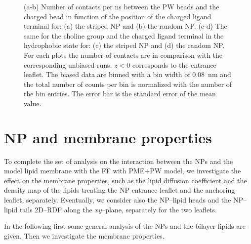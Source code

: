 \begin{figure}[ht!]
{		}
		\caption{(a-b) Number of contacts per ns between the \acs{PW} beads and the charged bead in function of the position of the charged ligand terminal for: (a) the striped \acs{NP} and (b) the random \acs{NP}. (c-d) The same for the choline group and the charged ligand terminal in the hydrophobic state for: (c) the striped \ac{NP} and (d) the random \acs{NP}. For each plots the number of contacts are in comparison with the corresponding unbiased runs. $z<0$ corresponds to the entrance leaflet. The biased data are binned with a bin width of $0.08$~nm and the total number of counts per bin is normalized with the number of the bin entries. The error bar is the standard error of the mean value.}%
		\label{fig:contactsUn}
\end{figure}

\clearpage
\section{NP and membrane properties}
To complete the set of analysis on the interaction between the \acp{NP} and the model lipid membrane with the 
\martini{} \ac{FF} with \ac{PME}$+$\ac{PW} model, we investigate the effect on the membrane properties, such as 
the lipid diffusion coefficient and the density map of the lipids treating the \ac{NP} entrance leaflet and the 
anchoring leaflet, separately. Eventually, we consider also the \ac{NP}--lipid heads and the \ac{NP}--lipid tails 
$2$D--\ac{RDF} along the $xy$--plane, separately for the two leaflets.

In the following first some general analysis of the \acp{NP} and the bilayer lipids are given. Then we investigate the membrane properties.

